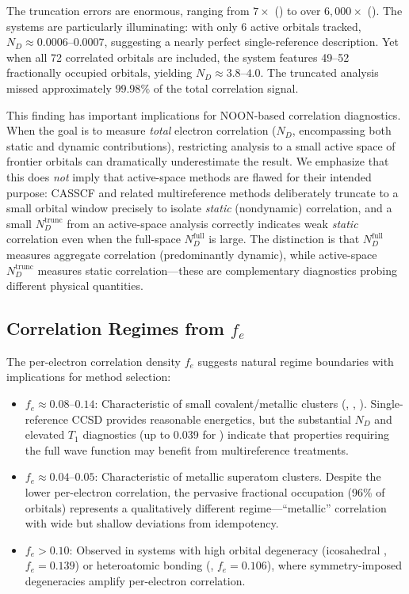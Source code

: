 \documentclass[12pt,a4paper]{article}
\begin{document}
The truncation errors are enormous, ranging from $7\times$ ()
to over $6{,}000\times$ (). The  systems are
particularly illuminating: with only 6 active orbitals tracked,
$N_D \approx 0.0006$--$0.0007$, suggesting a nearly
perfect single-reference description. Yet when all 72 correlated orbitals
are included, the system features 49--52 fractionally occupied orbitals,
yielding $N_D \approx 3.8$--$4.0$. The truncated analysis missed approximately
$99.98\%$ of the total correlation signal.

This finding has important implications for NOON-based correlation diagnostics.
When the goal is to measure \emph{total} electron correlation ($N_D$, encompassing
both static and dynamic contributions), restricting analysis to a small
active space of frontier orbitals can dramatically underestimate the result.
We emphasize that this does \emph{not} imply that active-space methods are
flawed for their intended purpose: CASSCF and related multireference methods
deliberately truncate to a small orbital window precisely to isolate
\emph{static} (nondynamic) correlation, and a small $N_D^{\text{trunc}}$ from
an active-space analysis correctly indicates weak \emph{static} correlation
even when the full-space $N_D^{\text{full}}$ is large.
The distinction is that $N_D^{\text{full}}$ measures aggregate correlation
(predominantly dynamic), while active-space $N_D^{\text{trunc}}$ measures
static correlation---these are complementary diagnostics probing different
physical quantities.

\subsection{Correlation Regimes from $f_e$}

The per-electron correlation density $f_e$ suggests natural regime boundaries
with implications for method selection:

\begin{itemize}
  \item $f_e \approx 0.08$--$0.14$:
    Characteristic of small covalent/metallic clusters (, ,
    ). Single-reference CCSD provides reasonable energetics, but
    the substantial $N_D$ and elevated $T_1$ diagnostics
    (up to 0.039 for ) indicate that properties requiring
    the full wave function may benefit from multireference treatments.

  \item $f_e \approx 0.04$--$0.05$:
    Characteristic of metallic superatom clusters. Despite the lower
    per-electron correlation, the pervasive fractional occupation (96\%
    of orbitals) represents a qualitatively different regime---``metallic''
    correlation with wide but shallow deviations from idempotency.

  \item $f_e > 0.10$:
    Observed in systems with high orbital degeneracy (icosahedral ,
    $f_e = 0.139$) or heteroatomic bonding (, $f_e = 0.106$),
    where symmetry-imposed degeneracies amplify per-electron correlation.
\end{itemize}
\end{document}
